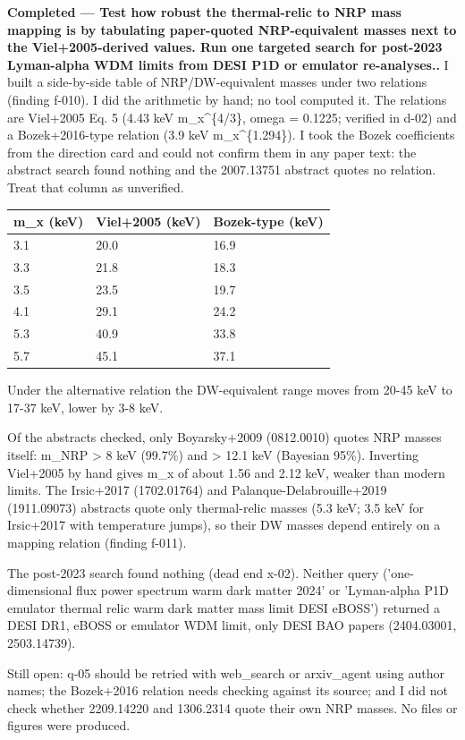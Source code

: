\documentclass[11pt,a4paper]{article}
\begin{document}
\textbf{Completed --- Test how robust the thermal-relic to NRP mass mapping is by tabulating paper-quoted NRP-equivalent masses next to the Viel+2005-derived values. Run one targeted search for post-2023 Lyman-alpha WDM limits from DESI P1D or emulator re-analyses..} I built a side-by-side table of NRP/DW-equivalent masses under two relations (finding f-010). I did the arithmetic by hand; no tool computed it. The relations are Viel+2005 Eq. 5 (4.43 keV m\_x\textasciicircum{}\{4/3\}, omega = 0.1225; verified in d-02) and a Bozek+2016-type relation (3.9 keV m\_x\textasciicircum{}\{1.294\}). I took the Bozek coefficients from the direction card and could not confirm them in any paper text: the abstract search found nothing and the 2007.13751 abstract quotes no relation. Treat that column as unverified.

\begin{longtable}{@{}p{}p{}p{}@{}}
\toprule
\textbf{m\_x (keV)} & \textbf{Viel+2005 (keV)} & \textbf{Bozek-type (keV)} \\ \midrule \endhead
3.1 & 20.0 & 16.9 \\
3.3 & 21.8 & 18.3 \\
3.5 & 23.5 & 19.7 \\
4.1 & 29.1 & 24.2 \\
5.3 & 40.9 & 33.8 \\
5.7 & 45.1 & 37.1 \\
\bottomrule\end{longtable}
Under the alternative relation the DW-equivalent range moves from 20-45 keV to 17-37 keV, lower by 3-8 keV.

Of the abstracts checked, only Boyarsky+2009 (0812.0010) quotes NRP masses itself: m\_NRP \textgreater{} 8 keV (99.7\%) and \textgreater{} 12.1 keV (Bayesian 95\%). Inverting Viel+2005 by hand gives m\_x of about 1.56 and 2.12 keV, weaker than modern limits. The Irsic+2017 (1702.01764) and Palanque-Delabrouille+2019 (1911.09073) abstracts quote only thermal-relic masses (5.3 keV; 3.5 keV for Irsic+2017 with temperature jumps), so their DW masses depend entirely on a mapping relation (finding f-011).

The post-2023 search found nothing (dead end x-02). Neither query ('one-dimensional flux power spectrum warm dark matter 2024' or 'Lyman-alpha P1D emulator thermal relic warm dark matter mass limit DESI eBOSS') returned a DESI DR1, eBOSS or emulator WDM limit, only DESI BAO papers (2404.03001, 2503.14739).

Still open: q-05 should be retried with web\_search or arxiv\_agent using author names; the Bozek+2016 relation needs checking against its source; and I did not check whether 2209.14220 and 1306.2314 quote their own NRP masses. No files or figures were produced.
\end{document}
